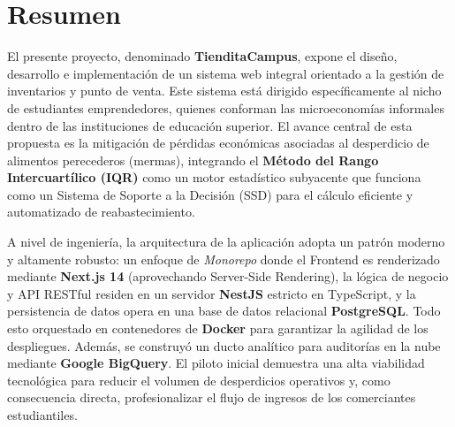 \documentclass[12pt, a4paper]{article}
\begin{document}
\newpage

\tableofcontents
\newpage
\listoffigures
\newpage
\listoftables

\newpage
\setcounter{page}{1}

\section{Resumen}
El presente proyecto, denominado \textbf{TienditaCampus}, expone el diseño, desarrollo e implementación de un sistema web integral orientado a la gestión de inventarios y punto de venta. Este sistema está dirigido específicamente al nicho de estudiantes emprendedores, quienes conforman las microeconomías informales dentro de las instituciones de educación superior. El avance central de esta propuesta es la mitigación de pérdidas económicas asociadas al desperdicio de alimentos perecederos (mermas), integrando el \textbf{Método del Rango Intercuartílico (IQR)} como un motor estadístico subyacente que funciona como un Sistema de Soporte a la Decisión (SSD) para el cálculo eficiente y automatizado de reabastecimiento.

A nivel de ingeniería, la arquitectura de la aplicación adopta un patrón moderno y altamente robusto: un enfoque de \textit{Monorepo} donde el Frontend es renderizado mediante \textbf{Next.js 14} (aprovechando Server-Side Rendering), la lógica de negocio y API RESTful residen en un servidor \textbf{NestJS} estricto en TypeScript, y la persistencia de datos opera en una base de datos relacional \textbf{PostgreSQL}. Todo esto orquestado en contenedores de \textbf{Docker} para garantizar la agilidad de los despliegues. Además, se construyó un ducto analítico para auditorías en la nube mediante \textbf{Google BigQuery}. El piloto inicial demuestra una alta viabilidad tecnológica para reducir el volumen de desperdicios operativos y, como consecuencia directa, profesionalizar el flujo de ingresos de los comerciantes estudiantiles.

\end{document}
